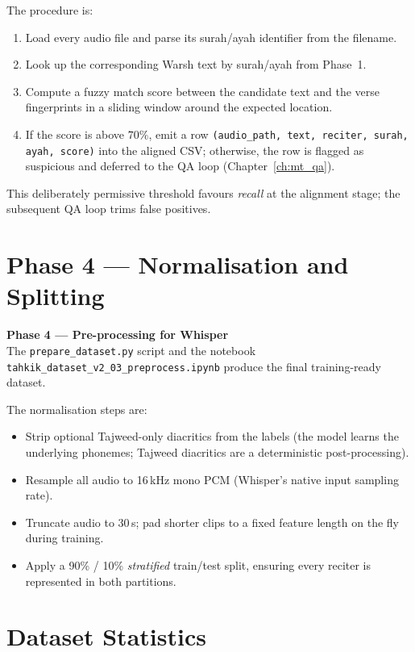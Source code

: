 \documentclass[12pt,a4paper]{report}
\newcommand{\phaseblock}[3]{%
  \begin{tcolorbox}[
    enhanced, colback=white, colframe=black,
    leftrule=5pt, sharp corners, before upper={\parindent0pt}
  ]
  {\bfseries\color{black}Phase #1 --- #2}\\[4pt]
  \small #3
  \end{tcolorbox}%
}
\begin{document}
The procedure is:
\begin{enumerate}
  \item Load every audio file and parse its surah/ayah identifier from the
        filename.
  \item Look up the corresponding Warsh text by surah/ayah from Phase~1.
  \item Compute a fuzzy match score between the candidate text and the
        verse fingerprints in a sliding window around the expected
        location.
  \item If the score is above $70\%$, emit a row
        \texttt{(audio\_path, text, reciter, surah, ayah, score)} into the
        aligned CSV; otherwise, the row is flagged as suspicious and
        deferred to the QA loop (Chapter~\ref{ch:mt_qa}).
\end{enumerate}

This deliberately permissive threshold favours \emph{recall} at the
alignment stage; the subsequent QA loop trims false positives.

\section{Phase 4 --- Normalisation and Splitting}

\phaseblock{4}{Pre-processing for Whisper}{The
\texttt{prepare\_dataset.py} script and the notebook
\texttt{tahkik\_dataset\_v2\_03\_preprocess.ipynb} produce the final
training-ready dataset.}

The normalisation steps are:
\begin{itemize}
  \item Strip optional Tajweed-only diacritics from the labels (the model
        learns the underlying phonemes; Tajweed diacritics are a
        deterministic post-processing).
  \item Resample all audio to 16\,kHz mono PCM (Whisper's native input
        sampling rate).
  \item Truncate audio to 30\,s; pad shorter clips to a fixed feature
        length on the fly during training.
  \item Apply a 90\% / 10\% \emph{stratified} train/test split, ensuring
        every reciter is represented in both partitions.
\end{itemize}

\section{Dataset Statistics}
\end{document}
